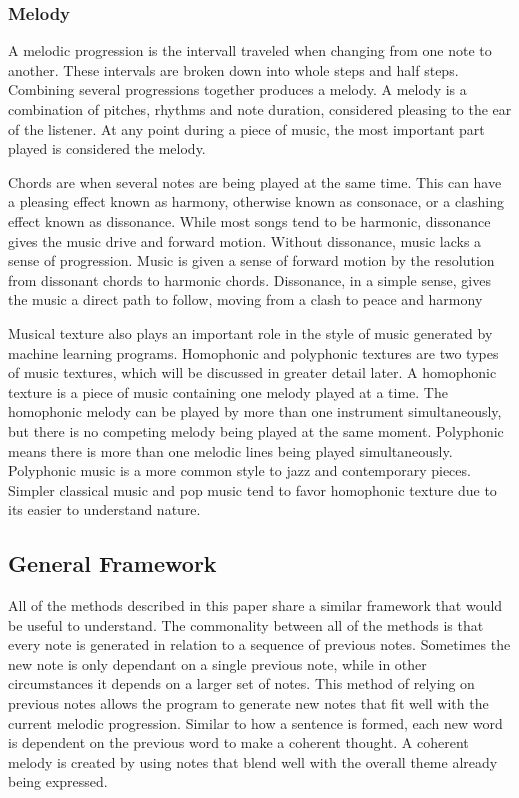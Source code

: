 \documentclass{sig-alternate}
\begin{document}
\subsubsection{Melody}
\label{sec:melody}
A melodic progression is the intervall traveled when changing from one note to another. These intervals are broken down into whole steps and half steps. Combining several progressions together produces a melody. A melody is a combination of pitches, rhythms and note duration, considered pleasing to the ear of the listener. At any point during a piece of music, the most important part played is considered the melody. 

Chords are when several notes are being played at the same time. This can have a pleasing effect known as harmony, otherwise known as consonace, or a clashing effect known as dissonance. While most songs tend to be harmonic, dissonance gives the music drive and forward motion. Without dissonance, music lacks a sense of progression. Music is given a sense of forward motion by the resolution from dissonant chords to harmonic chords. Dissonance, in a simple sense, gives the music a direct path to follow, moving from a clash to peace and harmony

Musical texture also plays an important role in the style of music generated by machine learning programs. Homophonic and polyphonic textures are two types of music textures, which will be discussed in greater detail later. A homophonic texture is a piece of music containing one melody played at a time. The homophonic melody can be played by more than one instrument simultaneously, but there is no competing melody being played at the same moment. Polyphonic means there is more than one melodic lines being played simultaneously. Polyphonic music is a more common style to jazz and contemporary pieces. Simpler classical music and pop music tend to favor homophonic texture due to its easier to understand nature.

\subsection{General Framework}
\label{sec:framework}
	All of the methods described in this paper share a similar framework that would be useful to understand. The commonality between all of the methods is that every note is generated in relation to a sequence of previous notes. Sometimes the new note is only dependant on a single previous note, while in other circumstances it depends on a larger set of notes. This method of relying on previous notes allows the program to generate new notes that fit well with the current melodic progression. Similar to how a sentence is formed, each new word is dependent on the previous word to make a coherent thought. A coherent melody is created by using notes that blend well with the overall theme already being expressed. 
\end{document}
